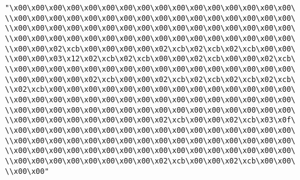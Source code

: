 \verb|"\x00\x00\x00\x00\x00\x00\x00\x00\x00\x00\x00\x00\x00\x00\x00\x00\|\newline
\verb|\\x00\x00\x00\x00\x00\x00\x00\x00\x00\x00\x00\x00\x00\x00\x00\x00\|\newline
\verb|\\x00\x00\x00\x00\x00\x00\x00\x00\x00\x00\x00\x00\x00\x00\x00\x00\|\newline
\verb|\\x00\x00\x00\x00\x00\x00\x00\x00\x00\x00\x00\x00\x00\x00\x00\x00\|\newline
\verb|\\x00\x00\x02\xcb\x00\x00\x00\x00\x02\xcb\x02\xcb\x02\xcb\x00\x00\|\newline
\verb|\\x00\x00\x03\x12\x02\xcb\x02\xcb\x00\x00\x02\xcb\x00\x00\x02\xcb\|\newline
\verb|\\x00\x00\x00\x00\x00\x00\x00\x00\x00\x00\x00\x00\x00\x00\x00\x00\|\newline
\verb|\\x00\x00\x00\x00\x02\xcb\x00\x00\x02\xcb\x02\xcb\x02\xcb\x02\xcb\|\newline
\verb|\\x02\xcb\x00\x00\x00\x00\x00\x00\x00\x00\x00\x00\x00\x00\x00\x00\|\newline
\verb|\\x00\x00\x00\x00\x00\x00\x00\x00\x00\x00\x00\x00\x00\x00\x00\x00\|\newline
\verb|\\x00\x00\x00\x00\x00\x00\x00\x00\x00\x00\x00\x00\x00\x00\x00\x00\|\newline
\verb|\\x00\x00\x00\x00\x00\x00\x00\x00\x02\xcb\x00\x00\x02\xcb\x03\x0f\|\newline
\verb|\\x00\x00\x00\x00\x00\x00\x00\x00\x00\x00\x00\x00\x00\x00\x00\x00\|\newline
\verb|\\x00\x00\x00\x00\x00\x00\x00\x00\x00\x00\x00\x00\x00\x00\x00\x00\|\newline
\verb|\\x00\x00\x00\x00\x00\x00\x00\x00\x00\x00\x00\x00\x00\x00\x00\x00\|\newline
\verb|\\x00\x00\x00\x00\x00\x00\x00\x00\x02\xcb\x00\x00\x02\xcb\x00\x00\|\newline
\verb|\\x00\x00"|\newline
